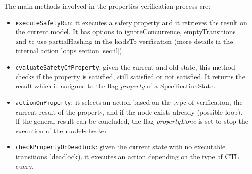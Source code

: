 \documentclass[12pt]{article}
\begin{document}
The main methods involved in the properties verification process are:
\begin{itemize}
	\item \texttt{executeSafetyRun}: it executes a safety property and it retrieves the result on the current model. It has options to ignoreConcurrence, emptyTransitions and to use partialHashing in the leadsTo verification (more details in the internal action loops section \ref{sec:il}).
	\item \texttt{evaluateSafetyOfProperty}: given the current and old state, this method checks if the property is satisfied, still satisfied or not satisfied. It returns the result which is assigned to the flag \textit{property} of a SpecificationState.
	\item \texttt{actionOnProperty}: it selects an action based on the type of verification, the current result of the property, and if the node exists already (possible loop). If the general result can be concluded, the flag \textit{propertyDone} is set to stop the execution of the model-checker.
	\item \texttt{checkPropertyOnDeadlock}: given the current state with no executable transitions (deadlock), it executes an action depending on the type of CTL query.
\end{itemize}
\end{document}
